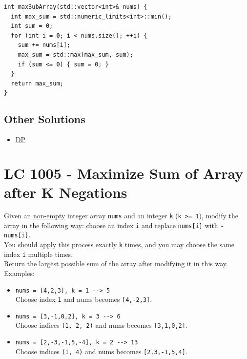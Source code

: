 \begin{lstlisting}
int maxSubArray(std::vector<int>& nums) {
  int max_sum = std::numeric_limits<int>::min();
  int sum = 0;
  for (int i = 0; i < nums.size(); ++i) {
    sum += nums[i];
    max_sum = std::max(max_sum, sum);
    if (sum <= 0) { sum = 0; }
  }
  return max_sum;
}
\end{lstlisting}

\subsection*{Other Solutions}
\begin{itemize}
\item \hyperref[solution:lc0053_dp]{DP}
\end{itemize}

\section{LC 1005 - Maximize Sum of Array after K Negations}
Given an \ul{non-empty} integer array {\colorbox{CodeBackground}{\lstinline|nums|}} and an integer {\colorbox{CodeBackground}{\lstinline|k|}} ({\colorbox{CodeBackground}{\lstinline|k >= 1|}}), modify the array in the following way: choose an index {\colorbox{CodeBackground}{\lstinline|i|}} and replace {\colorbox{CodeBackground}{\lstinline|nums[i]|}} with {\colorbox{CodeBackground}{\lstinline|-nums[i]|}}. \\

You should apply this process exactly {\colorbox{CodeBackground}{\lstinline|k|}} times, and you may choose the same index {\colorbox{CodeBackground}{\lstinline|i|}} multiple times.\\

Return the largest possible sum of the array after modifying it in this way.\\

Examples:
\begin{itemize}
\item {\colorbox{CodeBackground}{\lstinline|nums = [4,2,3], k = 1 --> 5|}}\\
Choose index {\colorbox{CodeBackground}{\lstinline|1|}} and nums becomes {\colorbox{CodeBackground}{\lstinline|[4,-2,3]|}}.
\item {\colorbox{CodeBackground}{\lstinline|nums = [3,-1,0,2], k = 3 --> 6|}}\\
Choose indices {\colorbox{CodeBackground}{\lstinline|(1, 2, 2)|}} and nums becomes {\colorbox{CodeBackground}{\lstinline|[3,1,0,2]|}}.
\item {\colorbox{CodeBackground}{\lstinline|nums = [2,-3,-1,5,-4], k = 2 --> 13|}}\\
Choose indices {\colorbox{CodeBackground}{\lstinline|(1, 4)|}} and nums becomes {\colorbox{CodeBackground}{\lstinline|[2,3,-1,5,4]|}}.
\end{itemize}

